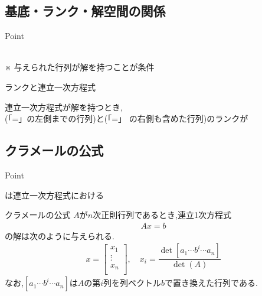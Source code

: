 \documentclass[a4paper]{jsarticle}
\begin{document}
\subsection{基底・ランク・解空間の関係}
\begin{itembox}[l]{Point}
    \begin{center}
        \\
        ※ 与えられた行列が解を持つことが条件\\
    \end{center}
\end{itembox}
\begin{itembox}[l]{ランクと連立一次方程式}
    \begin{center}
        連立一次方程式が解を持つとき,\\
        (「=」の左側までの行列)と(「=」 の右側も含めた行列)のランクが
    \end{center}
\end{itembox}
\subsection{クラメールの公式}
\begin{itembox}[l]{Point}
    \begin{center}
        は連立一次方程式における
    \end{center}
\end{itembox}
\begin{itembox}[l]{クラメールの公式}
    $A$が$n$次正則行列であるとき,連立1次方程式
    \begin{eqnarray*}
        Ax=b
    \end{eqnarray*}
    の解は次のように与えられる.
    \begin{eqnarray*}
        x=
        \begin{bmatrix}
            x_1    \\
            \vdots \\
            x_n    \\
        \end{bmatrix}
        , \quad
        x_i=\dfrac{\det \left[a_1\cdots b^i\cdots a_n\right]}{\det \left(A\right)}
    \end{eqnarray*}
    なお,$\left[a_1\cdots b^i\cdots a_n\right]$は$A$の第$i$列を列ベクトル$b$で置き換えた行列である.
\end{itembox}
\end{document}
